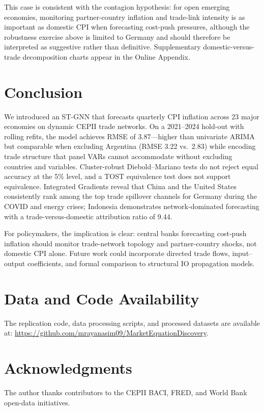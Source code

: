 \documentclass[12pt,a4paper]{article}
\begin{document}
This case is consistent with the contagion hypothesis: for open emerging economies, monitoring partner-country inflation and trade-link intensity is as important as domestic CPI when forecasting cost-push pressures, although the robustness exercise above is limited to Germany and should therefore be interpreted as suggestive rather than definitive.
Supplementary domestic-versus-trade decomposition charts appear in the Online Appendix.

\section{Conclusion}

We introduced an ST-GNN that forecasts quarterly CPI inflation across 23 major economies on dynamic CEPII trade networks.
On a 2021--2024 hold-out with rolling refits, the model achieves RMSE of 3.87---higher than univariate ARIMA but comparable when excluding Argentina (RMSE 3.22 vs.\ 2.83) while encoding trade structure that panel VARs cannot accommodate without excluding countries and variables.
Cluster-robust Diebold--Mariano tests do not reject equal accuracy at the 5\% level, and a TOST equivalence test does not support equivalence.
Integrated Gradients reveal that China and the United States consistently rank among the top trade spillover channels for Germany during the COVID and energy crises; Indonesia demonstrates network-dominated forecasting with a trade-versus-domestic attribution ratio of 9.44.

For policymakers, the implication is clear: central banks forecasting cost-push inflation should monitor trade-network topology and partner-country shocks, not domestic CPI alone.
Future work could incorporate directed trade flows, input--output coefficients, and formal comparison to structural IO propagation models.

\section*{Data and Code Availability}

The replication code, data processing scripts, and processed datasets are available at: \url{https://github.com/mrayanasim09/MarketEquationDiscovery}.

\section*{Acknowledgments}

The author thanks contributors to the CEPII BACI, FRED, and World Bank open-data initiatives.



\end{document}
